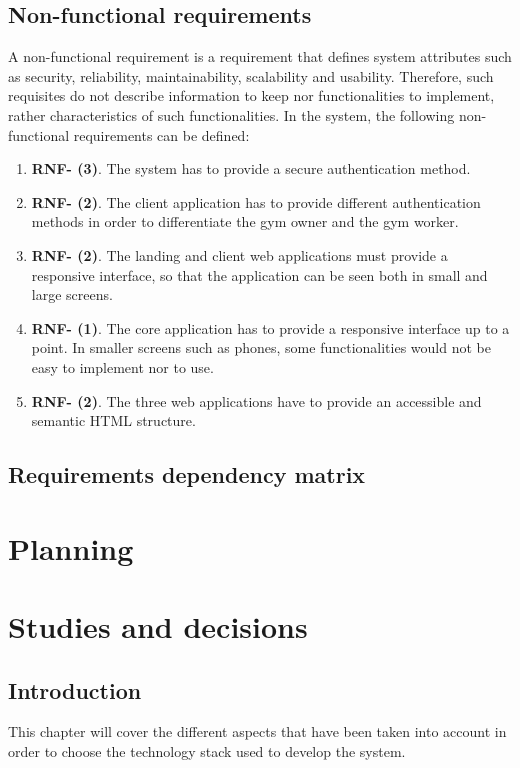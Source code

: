 \documentclass[a4paper, 12pt, oneside]{book}
\begin{document}
\section{Non-functional requirements}
A non-functional requirement is a requirement that defines system attributes such as security, reliability, maintainability, scalability and usability. Therefore, such requisites do not describe information to keep nor functionalities to implement, rather characteristics of such functionalities. In the system, the following non-functional requirements can be defined:
\begin{enumerate}[label = -]
	\item \textbf{RNF- (3)}. The system has to provide a secure authentication method.
	\item \textbf{RNF- (2)}. The client application has to provide different authentication methods in order to differentiate the gym owner and the gym worker.
	\item \textbf{RNF- (2)}. The landing and client web applications must provide a responsive interface, so that the application can be seen both in small and large screens.
	\item \textbf{RNF- (1)}. The core application has to provide a responsive interface up to a point. In smaller screens such as phones, some functionalities would not be easy to implement nor to use.
	\item \textbf{RNF- (2)}. The three web applications have to provide an accessible and semantic HTML structure.
\end{enumerate}
\section{Requirements dependency matrix}
\chapter{Planning}
\chapter{Studies and decisions}
\section{Introduction}
This chapter will cover the different aspects that have been taken into account in order to choose the technology stack used to develop the system.
\end{document}
